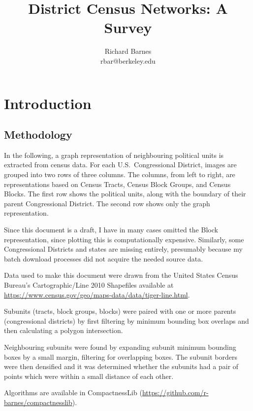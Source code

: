 \documentclass{book} %
\title{District Census Networks: A Survey}
\author{Richard Barnes \\ rbar@berkeley.edu}
\date{}
\begin{document}
\thispagestyle{empty}

\maketitle

\tableofcontents

\newpage

\chapter{Introduction}

\section{Methodology}

In the following, a graph representation of neighbouring political units is extracted from census data. For each U.S.\ Congressional District, images are grouped into two rows of three columns. The columns, from left to right, are representations based on Census Tracts, Census Block Groups, and Census Blocks. The first row shows the political units, along with the boundary of their parent Congressional District. The second row shows only the graph representation.

Since this document is a draft, I have in many cases omitted the Block representation, since plotting this is computationally expensive. Similarly, some Congressional Districts and states are missing entirely, presumably because my batch download processes did not acquire the needed source data.

Data used to make this document were drawn from the United States Census
Bureau's Cartographic/Line 2010 Shapefiles available at
\url{https://www.census.gov/geo/maps-data/data/tiger-line.html}.

Subunits (tracts, block groups, blocks) were paired with one or more parents (congressional districts) by first filtering by minimum bounding box overlaps and then calculating a polygon intersection.

Neighbouring subunits were found by expanding subunit minimum bounding boxes by a small margin, filtering for overlapping boxes. The subunit borders were then densified and it was determined whether the subunits had a pair of points which were within a small distance of each other.

Algorithms are available in CompactnessLib (\url{https://github.com/r-barnes/compactnesslib}).

\newpage



\newpage

\printindex
\end{document}
